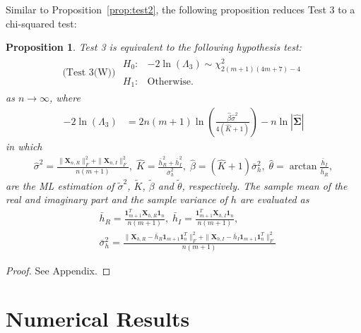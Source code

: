 \documentclass[journal,draftcls,onecolumn,12pt,twoside]{IEEEtran}
\newtheorem{proposition}{Proposition}
\begin{document}
Similar to Proposition~\ref{prop:test2}, the following proposition reduces Test
3 to a chi-squared test:
\begin{proposition}
  \label{prop:test3}
  Test 3 is equivalent to the following hypothesis test:
  \begin{align}
    \mbox{(Test 3(W)) } \begin{array}{ll}H_0: & -2\ln(\Lambda_3) \sim
    \chi_{2(m+1)(4m+7)-4}^2 \\ H_1: & \mbox{Otherwise.}
    \end{array}
  \end{align}
  as $n\rightarrow\infty$, where
  \begin{align}
    -2\ln(\Lambda_3) & =
    2n(m+1)\ln\left(\frac{\hat{\beta} \hat{\sigma}^2} {4(\hat{K}+1)}\right) -
    n\ln|\hat{\mathbf{\Sigma}}|
  \end{align}
  in which
  \begin{align}
    \hat{\sigma}^2 = \frac{\|\mathbf{X}_{n,R}\|_F^2 +
    \|\mathbf{X}_{n,I}\|_F^2}{n(m+1)} ,\; 
    \hat{K} = \frac{\bar{h}_R^2 + \bar{h}_I^2}{\bar{\sigma}^2_h},\;
    \hat{\beta} = (\hat{K} + 1)\bar{\sigma}^2_h ,\;
    \hat{\theta} =
    \arctan\frac{\bar{h}_I}{\bar{h}_R}, \label{eq:beta_sigma_ml}
  \end{align}
  are the ML estimation of $\tilde{\sigma}^2$, $\tilde{K}$, $\tilde{\beta}$ and
  $\tilde{\theta}$, respectively. The sample mean of the real and imaginary part
  and the sample variance of $h$ are evaluated as
  \begin{subequations}
    \begin{align}
      & \bar{h}_R =
      \frac{\mathbf{1}_{m+1}^T\mathbf{X}_{h,R}\mathbf{1}_n} {n(m+1)} ,\;
      \bar{h}_I = \frac{\mathbf{1}_{m+1}^T\mathbf{X}_{h,I}\mathbf{1}_n}
      {n(m+1)},\\
      & \bar{\sigma}^2_h = \frac{\|\mathbf{X}_{h,R} -
      \bar{h}_R\mathbf{1}_{m+1}\mathbf{1}_{n}^T\|_F^2 +
      \|\mathbf{X}_{h,I} -
      \bar{h}_I\mathbf{1}_{m+1}\mathbf{1}_{n}^T\|_F^2}{n(m+1)}
    \end{align}
  \end{subequations}
\end{proposition}
\begin{proof}
  See Appendix.
\end{proof}

\section{Numerical Results}
\label{sec:numerical}
\end{document}
